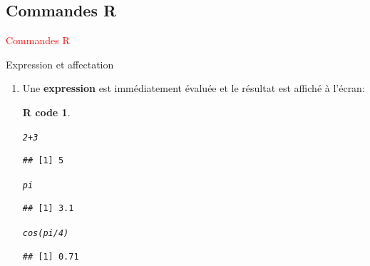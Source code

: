 \documentclass[11pt]{beamer}\usepackage[]{graphicx}\usepackage[]{color}
\makeatletter
\newcommand{\hlnum}[1]{\textcolor[rgb]{0.063,0.58,0.627}{#1}}%
\newcommand{\hlopt}[1]{\textcolor[rgb]{0.196,0.196,0.196}{#1}}%
\newcommand{\hlstd}[1]{\textcolor[rgb]{0.196,0.196,0.196}{#1}}%
\newcommand{\hlkwd}[1]{\textcolor[rgb]{0.78,0.227,0.412}{#1}}%
\newenvironment{kframe}{%
 \def\at@end@of@kframe{}%
 \ifinner\ifhmode%
  \def\at@end@of@kframe{\end{minipage}}%
  \begin{minipage}{\columnwidth}%
 \fi\fi%
 \def\FrameCommand##1{\hskip\@totalleftmargin \hskip-\fboxsep
 \colorbox{shadecolor}{##1}\hskip-\fboxsep
     \hskip-\linewidth \hskip-\@totalleftmargin \hskip\columnwidth}%
 \MakeFramed {\advance\hsize-\width
   \@totalleftmargin\z@ \linewidth\hsize
   \@setminipage}}%
 {\par\unskip\endMakeFramed%
 \at@end@of@kframe}
\newenvironment{knitrout}{}{} %
\newtheorem{rcode}{R code}[section]
\newcounter{saveenumi}
\newcommand{\seti}{\setcounter{saveenumi}{\value{enumi}}}
\makeatother
\begin{document}
\subsection{Commandes R}

\begin{frame}
 \begin{center}
  \Huge{\textcolor{red}{Commandes R}}
 \end{center}
\end{frame}


\begin{frame}[fragile]{Expression et affectation} 
\begin{enumerate}
\item Une \textbf{expression} est immédiatement évaluée et le résultat est affiché à l’écran:
\pause
\begin{knitrout}
\color{fgcolor}\begin{kframe}
\begin{rcode}\label{unnamed-chunk-22}\begin{alltt}
\hlnum{2} \hlopt{+} \hlnum{3}
\end{alltt}
\begin{verbatim}
## [1] 5
\end{verbatim}
\begin{alltt}
\hlstd{pi}
\end{alltt}
\begin{verbatim}
## [1] 3.1
\end{verbatim}
\begin{alltt}
\hlkwd{cos}\hlstd{(pi}\hlopt{/}\hlnum{4}\hlstd{)}
\end{alltt}
\begin{verbatim}
## [1] 0.71
\end{verbatim}
\end{rcode}\end{kframe}
\end{knitrout}
\seti
\end{enumerate}

\end{frame}
\end{document}
